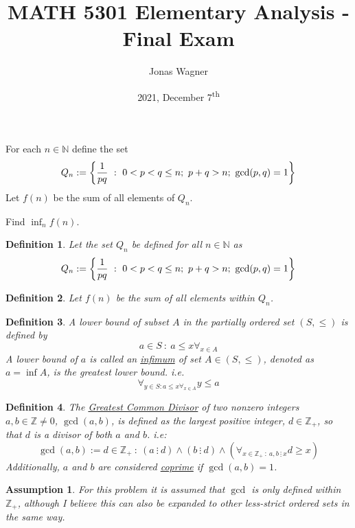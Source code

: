 \documentclass[]{article}
\title{MATH 5301 Elementary Analysis - Final Exam}
\author{Jonas Wagner}
\date{2021, December 7\textsuperscript{th}}
\newcommand{\N}{\mathbb{N}}
\newcommand{\Z}{\mathbb{Z}}
\newcommand{\divisible}{ \ \vdots \ }
\newcommand{\st}{\ : \ }
\newtheorem{definition}{Definition}
\newtheorem{assumption}{Assumption}
\begin{document}
\maketitle

\section{}
For each $n \in \N$ define the set
\[
    Q_n := \qty{
        \frac{1}{pq} \st 0 < p < q \leq n; \ p + q > n; \ \textnormal{gcd}(p,q) = 1
    }
\]
Let $f(n)$ be the sum of all elements of $Q_n$.

Find $\inf_n f(n)$.

\begin{definition}\label{def:pblm1_Qn}
    Let the set $Q_n$ be defined for all $n \in \N$ as
    \[
        Q_n := \qty{
            \frac{1}{pq} \st 0 < p < q \leq n; \ p + q > n; \ \gcd(p,q) = 1
        }
    \]
\end{definition}

\begin{definition}\label{def:pblm1_fn}
    Let $f(n)$ be the sum of all elements within $Q_n$.
\end{definition}

\begin{definition}\label{def:infimum}
    A lower bound of subset $A$ in the partially ordered set $(S,\leq)$ is defined by
    \[
        a \in S \st a \leq x \forall_{x \in A}
    \]
    A lower bound of $a$ is called an \emph{\underline{infimum}} of set $A \in (S,\leq)$,
    denoted as $a = \inf A$, is the greatest lower bound. i.e.
    \[
        \forall_{y \in S : a \leq x \forall_{x \in A}} y \leq a
    \]
\end{definition}

\begin{definition}
    The \underline{\emph{Greatest Common Divisor}} of two nonzero integers $a,b \in \Z \neq 0$, $\gcd(a,b)$, 
    is defined as the largest positive integer, $d \in \Z_+$, so that $d$ is a divisor of both $a$ and $b$.
    i.e:
    \[
        \gcd(a,b) := d \in \Z_+ \st (a \divisible d) \land (b \divisible d) 
                    \land (\forall_{x \in \Z_+ \st a,b \divisible x} d \geq x)
    \]
    Additionally, $a$ and $b$ are considered \emph{\underline{coprime}} if $\gcd(a,b) = 1$.
\end{definition}

\begin{assumption}
    For this problem it is assumed that $\gcd$ is only defined within $\Z_+$, 
    although I believe this can also be expanded to other less-strict ordered sets in the same way.
\end{assumption}
\end{document}
